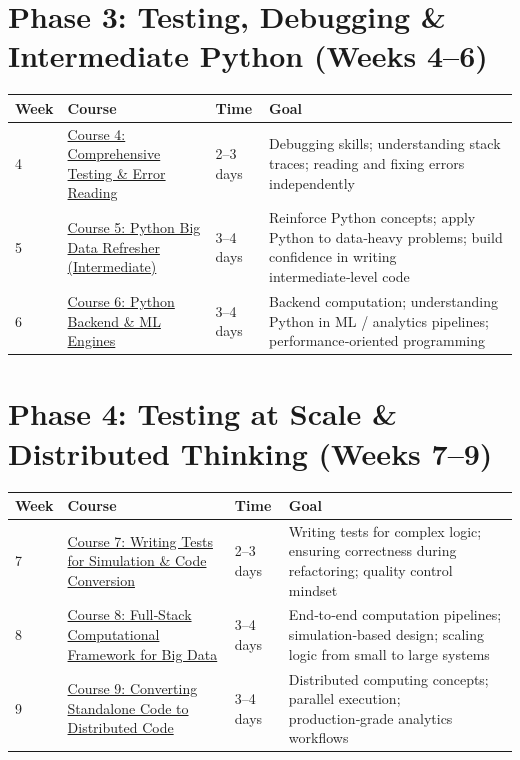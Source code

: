 \documentclass[12pt]{article}
\begin{document}
	\vspace{0.3cm}
	
	\section*{ Phase 3: Testing, Debugging \& Intermediate Python (Weeks 4–6)}
	
	\begin{tabularx}{\textwidth}{|X|p{3cm}|p{3cm}|X|}
		\hline
		\textbf{Week} & \textbf{Course} & \textbf{Time} & \textbf{Goal} \\
		\hline
		4 & \href{https://www.udemy.com/course/full-spectrum-comprehensive-testing-error-reading-101/}{Course 4: Comprehensive Testing \& Error Reading} & 2–3 days & Debugging skills; understanding stack traces; reading and fixing errors independently \\
		\hline
		5 & \href{https://www.udemy.com/course/refresher-python-big-data-intermediate-quiz-based-course-102/}{Course 5: Python Big Data Refresher (Intermediate)} & 3–4 days & Reinforce Python concepts; apply Python to data‑heavy problems; build confidence in writing intermediate‑level code \\
		\hline
		6 & \href{https://www.udemy.com/course/python-full-stack-and-backend-engines-for-mc-ml-engines-102/}{Course 6: Python Backend \& ML Engines} & 3–4 days & Backend computation; understanding Python in ML / analytics pipelines; performance‑oriented programming \\
		\hline
	\end{tabularx}
	
	\vspace{0.3cm}
	
	\section*{Phase 4: Testing at Scale \& Distributed Thinking (Weeks 7–9)}
	
	\begin{tabularx}{\textwidth}{|X|p{3cm}|p{3cm}|X|}
		\hline
		\textbf{Week} & \textbf{Course} & \textbf{Time} & \textbf{Goal} \\
		\hline
		7 & \href{https://www.udemy.com/course/writing-tests-for-simeng-python-code-conversion-concepts-101/}{Course 7: Writing Tests for Simulation \& Code Conversion} & 2–3 days & Writing tests for complex logic; ensuring correctness during refactoring; quality control mindset \\
		\hline
		8 & \href{https://www.udemy.com/course/full-stack-computational-framework-for-big-data-simulations/}{Course 8: Full‑Stack Computational Framework for Big Data} & 3–4 days & End‑to‑end computation pipelines; simulation‑based design; scaling logic from small to large systems \\
		\hline
		9 & \href{https://www.udemy.com/course/converting-standalone-code-to-distributed-code-for-analytics/}{Course 9: Converting Standalone Code to Distributed Code} & 3–4 days & Distributed computing concepts; parallel execution; production‑grade analytics workflows \\
		\hline
	\end{tabularx}
	
\end{document}
